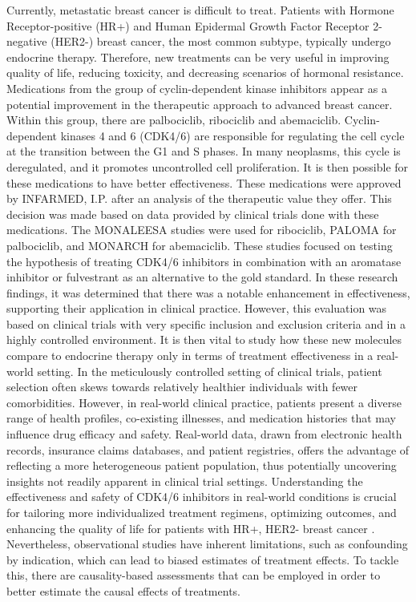 Currently, metastatic breast cancer is difficult to treat. Patients with Hormone Receptor-positive (HR+) and Human Epidermal Growth Factor Receptor 2-negative (HER2-) breast cancer, the most common subtype, typically undergo endocrine therapy. Therefore, new treatments can be very useful in improving quality of life, reducing toxicity, and decreasing scenarios of hormonal resistance. Medications from the group of cyclin-dependent kinase inhibitors appear as a potential improvement in the therapeutic approach to advanced breast cancer. Within this group, there are palbociclib, ribociclib and abemaciclib. Cyclin-dependent kinases 4 and 6 (CDK4/6) are responsible for regulating the cell cycle at the transition between the G1 and S phases. In many neoplasms, this cycle is deregulated, and it promotes uncontrolled cell proliferation. It is then possible for these medications to have better effectiveness. These medications were approved by INFARMED, I.P. after an analysis of the therapeutic value they offer. This decision was made based on data provided by clinical trials done with these medications. The MONALEESA \cite{hortobagyiUpdatedResultsMONALEESA22018, slamonPhaseIIIRandomized2018, tripathyRibociclibEndocrineTherapy2018} studies were used for ribociclib, PALOMA \cite{vermaPalbociclibCombinationFulvestrant2016, rugoImpactPalbociclibLetrozole2018, finnCyclindependentKinaseInhibitor2015a} for palbociclib, and MONARCH \cite{goetzMONARCHAbemaciclibInitial2017, sledgeMONARCHAbemaciclibCombination2017} for abemaciclib. These studies focused on testing the hypothesis of treating CDK4/6 inhibitors in combination with an aromatase inhibitor or fulvestrant as an alternative to the gold standard. In these research findings, it was determined that there was a notable enhancement in effectiveness, supporting their application in clinical practice. However, this evaluation was based on clinical trials with very specific inclusion and exclusion criteria and in a highly controlled environment. It is then vital to study how these new molecules compare to endocrine therapy only in terms of treatment effectiveness in a real-world setting. In the meticulously controlled setting of clinical trials, patient selection often skews towards relatively healthier individuals with fewer comorbidities. However, in real-world clinical practice, patients present a diverse range of health profiles, co-existing illnesses, and medication histories that may influence drug efficacy and safety. Real-world data, drawn from electronic health records, insurance claims databases, and patient registries, offers the advantage of reflecting a more heterogeneous patient population, thus potentially uncovering insights not readily apparent in clinical trial settings. Understanding the effectiveness and safety of CDK4/6 inhibitors in real-world conditions is crucial for tailoring more individualized treatment regimens, optimizing outcomes, and enhancing the quality of life for patients with HR+, HER2- breast cancer \cite{harbeckCDK4InhibitorsHR2021}. Nevertheless, observational studies have inherent limitations, such as confounding by indication, which can lead to biased estimates of treatment effects. To tackle this, there are causality-based assessments that can be employed in order to better estimate the causal effects of treatments.
